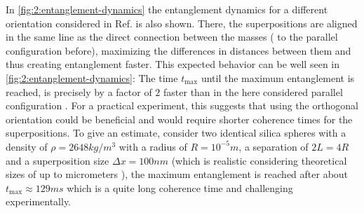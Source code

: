 In \cref{fig:2:entanglement-dynamics} the entanglement dynamics for a different orientation considered in Ref. \cite{Pedernales_2023} is also shown. 
There, the superpositions are aligned in the same line as the direct connection between the masses ( to the parallel configuration before), maximizing the differences in distances between them and thus creating entanglement faster. This expected behavior can be well seen in \cref{fig:2:entanglement-dynamics}: The time $t_\mathrm{max}$ until the maximum entanglement is reached, is precisely by a factor of $2$ faster than in the here considered parallel configuration \cite{Pedernales_2023}. 
For a practical experiment, this suggests that using the orthogonal orientation could be beneficial and would require shorter coherence times for the superpositions.
To give an estimate, consider two identical silica spheres with a density of $\rho=2648\si{kg/m^3}$ with a radius of $R=10^{-5}\si{m}$, a separation of $2L = 4R$ and a superposition size $\Delta x = 100\si{nm}$ (which is realistic considering theoretical sizes of up to micrometers \cite{Bose_2017}), the maximum entanglement is reached after about $t_\mathrm{max} \approx 129\si{ms}$ which is a quite long coherence time and challenging experimentally.